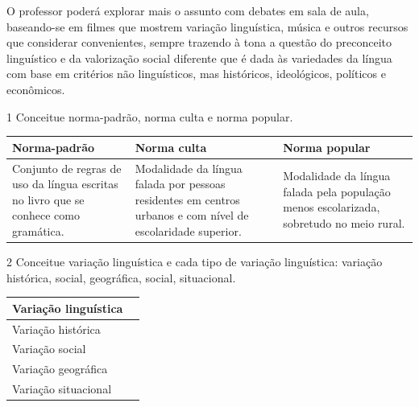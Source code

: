 O professor poderá explorar mais o assunto com debates em sala de aula,
baseando-se em filmes que mostrem variação linguística, música e outros
recursos que considerar convenientes, sempre trazendo à tona a questão
do preconceito linguístico e da valorização social diferente que é dada
às variedades da língua com base em critérios não linguísticos, mas
históricos, ideológicos, políticos e econômicos.


\num{1} Conceitue norma-padrão, norma culta e norma popular.

\begin{longtable}[]{@{}lll@{}}
\toprule
Norma-padrão & Norma culta & Norma popular\tabularnewline
\midrule
\endhead
Conjunto de regras de uso da língua escritas no livro que se conhece
como gramática. & Modalidade da língua falada por pessoas residentes em
centros urbanos e com nível de escolaridade superior. & Modalidade da
língua falada pela população menos escolarizada, sobretudo no meio
rural.\tabularnewline
\bottomrule
\end{longtable}

\num{2} Conceitue variação linguística e cada tipo de variação
linguística: variação histórica, social, geográfica, social,
situacional.

\begin{longtable}[]{@{}ll@{}}
\toprule
Variação linguística &\tabularnewline
\midrule
\endhead
Variação histórica &\tabularnewline
Variação social &\tabularnewline
Variação geográfica &\tabularnewline
Variação situacional &\tabularnewline
\bottomrule
\end{longtable}


